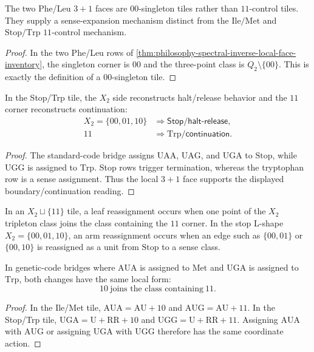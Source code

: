 \begin{corollary}
\label{cor:philosophy-spectral-inverse-phe-leu-sense-expansion}
The two Phe/Leu $3+1$ faces are $00$-singleton tiles rather than
$11$-control tiles. They supply a sense-expansion mechanism distinct from
the $\mathrm{Ile}/\mathrm{Met}$ and $\mathrm{Stop}/\mathrm{Trp}$
$11$-control mechanism.
\end{corollary}
\begin{proof}
In the two Phe/Leu rows of
\autoref{thm:philosophy-spectral-inverse-local-face-inventory}, the
singleton corner is $00$ and the three-point class is
$Q_{2}\setminus\{00\}$. This is exactly the definition of a
$00$-singleton tile.
\end{proof}

\begin{theorem}
\label{thm:philosophy-inverse-stop-trp-boundary-continuation}
In the Stop/Trp tile, the $X_{2}$ side reconstructs halt/release behavior
and the $11$ corner reconstructs continuation:
$$
\begin{aligned}
  X_{2}=\{00,01,10\}
    &\Longrightarrow \mathsf{Stop}/\mathsf{halt}\text{-}\mathsf{release},\\
  11
    &\Longrightarrow \mathrm{Trp}/\mathsf{continuation}.
\end{aligned}
$$
\end{theorem}
\begin{proof}
The standard-code bridge assigns $\mathrm{UAA}$, $\mathrm{UAG}$, and
$\mathrm{UGA}$ to $\mathrm{Stop}$, while $\mathrm{UGG}$ is assigned to
$\mathrm{Trp}$. Stop rows trigger termination, whereas the tryptophan row
is a sense assignment. Thus the local $3+1$ face supports the displayed
boundary/continuation reading.
\end{proof}

\begin{definition}
\label{def:philosophy-inverse-leaf-arm-reassignment}
In an $X_{2}\sqcup\{11\}$ tile, a leaf reassignment occurs when one point
of the $X_{2}$ tripleton class joins the class containing the $11$ corner.
In the stop L-shape $X_{2}=\{00,01,10\}$, an arm reassignment occurs when
an edge such as $\{00,01\}$ or $\{00,10\}$ is reassigned as a unit from
$\mathrm{Stop}$ to a sense class.
\end{definition}

\begin{proposition}
\label{prop:philosophy-inverse-dual-ten-to-eleven-reassignment}
In genetic-code bridges where $\mathrm{AUA}$ is assigned to
$\mathrm{Met}$ and $\mathrm{UGA}$ is assigned to $\mathrm{Trp}$, both
changes have the same local form:
$$
  10\ \text{joins the class containing}\ 11.
$$
\end{proposition}
\begin{proof}
In the Ile/Met tile, $\mathrm{AUA}=\mathrm{AU}+10$ and
$\mathrm{AUG}=\mathrm{AU}+11$. In the Stop/Trp tile,
$\mathrm{UGA}=\mathrm{U}+\mathrm{RR}+10$ and
$\mathrm{UGG}=\mathrm{U}+\mathrm{RR}+11$. Assigning $\mathrm{AUA}$ with
$\mathrm{AUG}$ or assigning $\mathrm{UGA}$ with $\mathrm{UGG}$ therefore
has the same coordinate action.
\end{proof}

